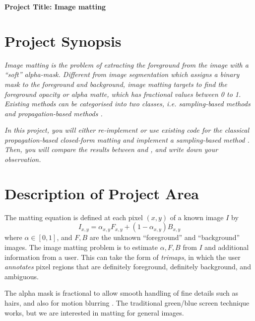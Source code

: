 \documentclass{article}
\begin{document}
\begin{center}
    \textbf{Project Title: Image matting}
\end{center}
\setcounter{section}{-1}
\section{Project Synopsis}
\emph{Image matting is the problem of extracting the foreground from the image with a ``soft'' alpha-mask. Different from image segmentation which assigns a binary mask to the foreground and background, image matting targets to find the foreground opacity or alpha matte, which has fractional values between 0 to 1. Existing methods can be categorised into two classes, i.e. sampling-based methods \cite{bayesian-matting, robust-matting} and propagation-based methods \cite{poisson-matting, closed-form-matting}.}

\emph{In this project, you will either re-implement or use existing code for the classical propagation-based closed-form matting \cite{closed-form-matting} and implement a sampling-based method \cite{robust-matting}. Then, you will compare the results between \cite{closed-form-matting} and \cite{robust-matting}, and write down your observation.}

\section{Description of Project Area}


The matting equation is defined at each pixel $(x,y)$ of a known image $I$ by
$$I_{x,y} = \alpha_{x,y} F_{x,y}  + (1-\alpha_{x,y}) B_{x,y}$$
where $\alpha\in[0,1]$, and $F,B$ are the unknown ``foreground'' and ``background'' images. The image matting problem is to estimate $\alpha,F,B$ from $I$ and additional information from a user. This can take the form of \emph{trimaps}, in which the user \emph{annotates} pixel regions that are definitely foreground, definitely background, and ambiguous.

The alpha mask is fractional to allow smooth handling of fine details such as hairs, and also for motion blurring \cite{bayesian-matting}. The traditional green/blue screen technique works, but we are interested in matting for general images.
\end{document}
